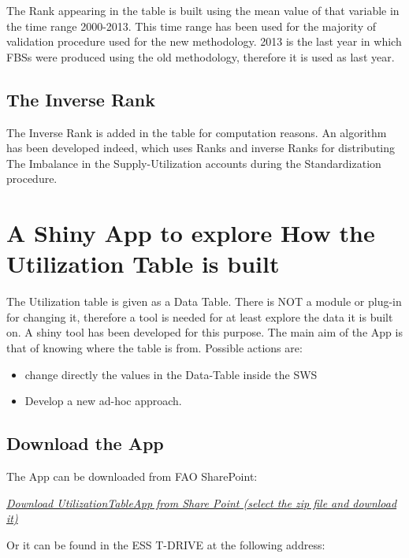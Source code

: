 \documentclass[]{article}
\providecommand{\tightlist}{%
  \setlength{\itemsep}{0pt}\setlength{\parskip}{0pt}}
\begin{document}
The Rank appearing in the table is built using the mean value of that
variable in the time range 2000-2013. This time range has been used for
the majority of validation procedure used for the new methodology. 2013
is the last year in which FBSs were produced using the old methodology,
therefore it is used as last year.

\subsection{The Inverse Rank}\label{the-inverse-rank}

The Inverse Rank is added in the table for computation reasons. An
algorithm has been developed indeed, which uses Ranks and inverse Ranks
for distributing The Imbalance in the Supply-Utilization accounts during
the Standardization procedure.

\section{A Shiny App to explore How the Utilization Table is
built}\label{a-shiny-app-to-explore-how-the-utilization-table-is-built}

The Utilization table is given as a Data Table. There is NOT a module or
plug-in for changing it, therefore a tool is needed for at least explore
the data it is built on. A shiny tool has been developed for this
purpose. The main aim of the App is that of knowing where the table is
from. Possible actions are:

\begin{itemize}
\tightlist
\item
  change directly the values in the Data-Table inside the SWS
\item
  Develop a new ad-hoc approach.
\end{itemize}

\subsection{Download the App}\label{download-the-app}

The App can be downloaded from FAO SharePoint:

\href{https://unfao-my.sharepoint.com/:u:/g/personal/cristina_muschitiello_fao_org/EY8G-QNTrfBBjtm-4duSCY8BT8Ebp7ODhyMqgVE4Phz77A?e=vJzHPg}{\emph{Download
UtilizationTableApp from Share Point (select the zip file and download
it)}}

Or it can be found in the ESS T-DRIVE at the following address:
\end{document}
